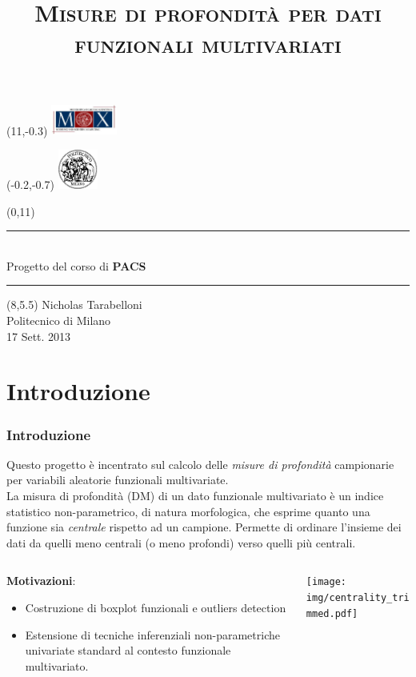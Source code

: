 \documentclass[9pt]{beamer}
\title{\textsc{Misure di profondit\`a per dati funzionali multivariati}}
\author{}
\date{}
\newcommand{\MyLogoSxUp}{%
 \begin{textblock}{14}(-0.2,-0.7)
   \includegraphics[height=1.3cm, angle=0]{img/logopoli.pdf}
  \end{textblock}
 }
\newcommand{\MyLogoDxUp}{%
  \begin{textblock}{14}(11,-0.3)
   \includegraphics[height=1cm, angle=0]{img/logomox}
  \end{textblock}
 }
\begin{document}


\begin{frame}
\MyLogoDxUp
\MyLogoSxUp
\begin{textblock}{10}(0,11)
{
\scriptsize
\rule{3.2cm}{1pt}\\
\medskip
Progetto del corso di \textbf{PACS}\\
\rule{3.2cm}{1pt}
}
\end{textblock}
\begin{textblock}{10}(8,5.5)
Nicholas Tarabelloni\\
{\smallskip \scriptsize Politecnico di Milano\\
17 Sett. 2013 }
\end{textblock}

 \maketitle
\end{frame}


\section{Introduzione}

\begin{frame}
 \frametitle{Introduzione}
Questo progetto \`e incentrato sul calcolo delle \emph{misure di profondit\`a} campionarie per variabili aleatorie funzionali multivariate.\\
\smallskip
La misura di profondit\`a (DM) di un dato funzionale multivariato \`e un indice statistico non-parametrico, di natura morfologica, che esprime quanto una funzione sia
  \emph{centrale} rispetto ad un campione. Permette di ordinare l'insieme dei dati da quelli meno centrali (o meno profondi) verso quelli
più centrali.\\
\smallskip
\begin{columns}
  \begin{column}{0.4\textwidth}
  \textbf{Motivazioni}:
 \begin{itemize}
  \item Costruzione di boxplot funzionali e outliers detection\\
  \item Estensione di tecniche inferenziali non-parametriche univariate standard al contesto funzionale multivariato.\\
  \end{itemize}
  \end{column}
  \begin{column}{0.6\textwidth}
  \texttt{[image: img/centrality\_trimmed.pdf]}
\end{column}
\end{columns}
\end{frame}
\end{document}
